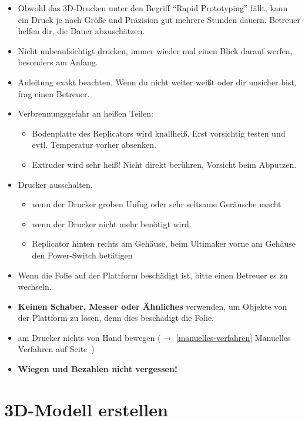 \documentclass{\basedir/fablab-document}
\begin{document}
\begin{itemize}
 \item Obwohl das 3D-Drucken unter den Begriff ``Rapid Prototyping'' fällt, kann ein Druck je nach Größe und 
 Präzision gut mehrere Stunden dauern. Betreuer helfen dir, die Dauer abzuschätzen. 
 \item Nicht unbeaufsichtigt drucken, immer wieder mal einen Blick darauf werfen, besonders am Anfang. 
 \item Anleitung exakt beachten. Wenn du nicht weiter weißt oder dir unsicher bist, frag einen Betreuer.
 \item Verbrennungsgefahr an heißen Teilen:
  \begin{itemize}
   \item Bodenplatte des Replicators wird knallheiß. Erst vorsichtig testen und evtl. Temperatur vorher absenken.
   \item Extruder wird sehr heiß! Nicht direkt berühren, Vorsicht beim Abputzen.
  \end{itemize}
 \item Drucker ausschalten,
 \begin{itemize}
  \item wenn der Drucker groben Unfug oder sehr seltsame Geräusche macht
  \item wenn der Drucker nicht mehr benötigt wird
  \item Replicator hinten rechts am Gehäuse, beim Ultimaker vorne am Gehäuse den Power-Switch betätigen
 \end{itemize}
 \item Wenn die Folie auf der Plattform beschädigt ist, bitte einen Betreuer es zu wechseln.
 \item \textbf{Keinen Schaber, Messer oder Ähnliches} verwenden, um Objekte von der Plattform zu lösen, denn dies beschädigt die Folie.
 \item am Drucker nichts von Hand bewegen ($\to$ \ref{manuelles-verfahren} Manuelles Verfahren auf Seite\, \pageref{manuelles-verfahren})
 \item \textbf{Wiegen und Bezahlen nicht vergessen!}
\end{itemize}
\newpage
\renewcommand{\contentsname}{Inhaltsverzeichnis / Arbeitsablauf}
\setcounter{tocdepth}{2}
\tableofcontents

\newpage

\section{3D-Modell erstellen}
\end{document}
